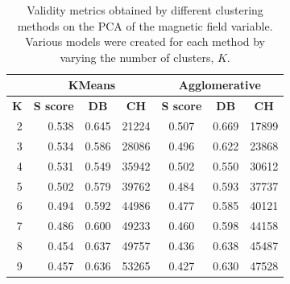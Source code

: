 \begin{table}[h]
    \caption[Validity metrics for PCA of the Magnetic Field]{Validity metrics obtained by different clustering methods on the PCA of the magnetic field variable. Various models were created for each method by varying the number of clusters, $K$.}\label{tab:pca_b}
    \begin{tabular}{@{}rrrrccc@{}}
        \cmidrule(l){2-7}
    \multicolumn{1}{c}{\textbf{}}   & \multicolumn{3}{c}{\textbf{KMeans}}                                                                       & \multicolumn{3}{c}{\textbf{Agglomerative}}   \\ \midrule
    \multicolumn{1}{c|}{\textbf{K}} & \multicolumn{1}{c}{\textbf{S score}} & \multicolumn{1}{c}{\textbf{DB}} & \multicolumn{1}{c|}{\textbf{CH}} & \textbf{S score} & \textbf{DB} & \textbf{CH} \\ \midrule
    \multicolumn{1}{r|}{2}          & 0.538                                & 0.645                           & \multicolumn{1}{r|}{21224}   & 0.507            & 0.669       & 17899   \\
    \multicolumn{1}{r|}{3}          & 0.534                                & 0.586                           & \multicolumn{1}{r|}{28086}   & 0.496            & 0.622       & 23868   \\
    \multicolumn{1}{r|}{4}          & 0.531                                & 0.549                           & \multicolumn{1}{r|}{35942}   & 0.502            & 0.550       & 30612   \\
    \multicolumn{1}{r|}{5}          & 0.502                                & 0.579                           & \multicolumn{1}{r|}{39762}   & 0.484            & 0.593       & 37737   \\
    \multicolumn{1}{r|}{6}          & 0.494                                & 0.592                           & \multicolumn{1}{r|}{44986}   & 0.477            & 0.585       & 40121   \\
    \multicolumn{1}{r|}{7}          & 0.486                                & 0.600                           & \multicolumn{1}{r|}{49233}   & 0.460            & 0.598       & 44158   \\
    \multicolumn{1}{r|}{8}          & 0.454                                & 0.637                           & \multicolumn{1}{r|}{49757}   & 0.436            & 0.638       & 45487   \\
    \multicolumn{1}{r|}{9}          & 0.457                                & 0.636                           & \multicolumn{1}{r|}{53265}   & 0.427            & 0.630       & 47528   \\ \bottomrule
    \end{tabular}
    \end{table}

